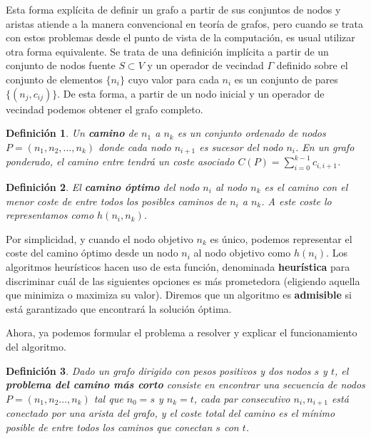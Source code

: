 \documentclass[a4paper,12pt]{article}
\newtheorem{defn}{Definición}
\begin{document}
Esta forma explícita de definir un grafo a partir de sus conjuntos de nodos y aristas atiende a la manera convencional en teoría de grafos, pero cuando se trata con estos problemas desde el punto de vista de la computación, es usual utilizar otra forma equivalente. Se trata de una definición implícita a partir de un conjunto de nodos fuente $S\subset V$ y un operador de vecindad $\Gamma$ definido sobre el conjunto de elementos $\{n_i\}$ cuyo valor para cada $n_i$ es un conjunto de pares $\{(n_j, c_{ij})\}$. De esta forma, a partir de un nodo inicial y un operador de vecindad podemos obtener el grafo completo.

\begin{defn}
Un \textbf{camino} de $n_1$ a $n_k$ es un conjunto ordenado de nodos $P = (n_1,n_2, \allowbreak \dots ,n_k)$ donde cada nodo $n_{i+1}$ es sucesor del nodo $n_i$. En un grafo ponderado, el camino entre tendrá un coste asociado $C(P) = \sum_{i=0}^{k-1}c_{i,i+1}$.
\end{defn}

\noindent 

\begin{defn}
El \textbf{camino óptimo} del nodo $n_i$ al nodo $n_k$ es el camino con el menor coste de entre todos los posibles caminos de $n_i$ a $n_k$. A este coste lo representamos como $h(n_i, n_k)$.
\end{defn}

\noindent Por simplicidad, y cuando el nodo objetivo $n_k$ es único, podemos representar el coste del camino óptimo desde un nodo $n_i$ al nodo objetivo como $h(n_i)$. Los algoritmos heurísticos hacen uso de esta función, denominada \textbf{heurística} para discriminar cuál de las siguientes opciones es más prometedora (eligiendo aquella que minimiza o maximiza su valor). Diremos que un algoritmo es \textbf{admisible} si está garantizado que encontrará la solución óptima.

Ahora, ya podemos formular el problema a resolver y explicar el funcionamiento del algoritmo.

\begin{defn}\label{def:shortest_path_problem}
Dado un grafo dirigido con pesos positivos y dos nodos $s$ y $t$, el \textbf{problema del camino más corto} consiste en encontrar una secuencia de nodos $P = (n_1, n_2 \dots, n_k)$ tal que $n_0 = s$ y $n_k = t$, cada par consecutivo $n_i, n_{i+1}$ está conectado por una arista del grafo, y el coste total del camino es el mínimo posible de entre todos los caminos que conectan $s$ con $t$.
\end{defn}
\end{document}
